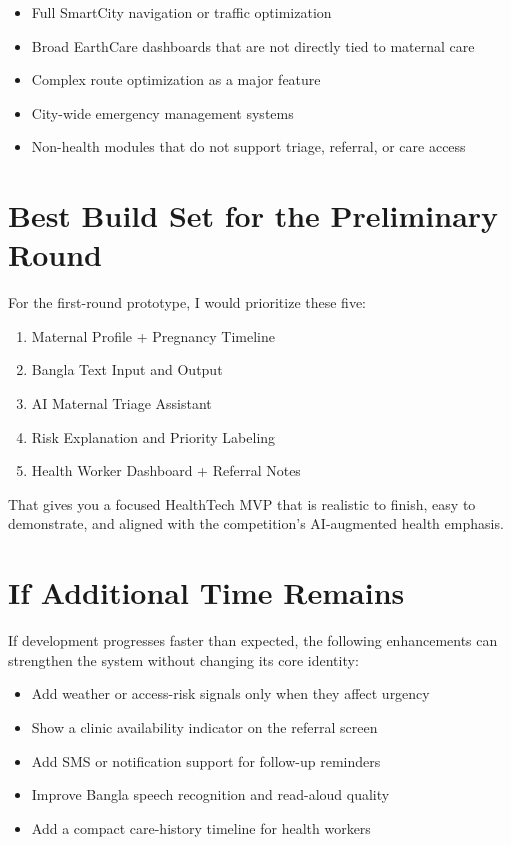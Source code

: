 \documentclass[11pt]{article}
\begin{document}
\begin{itemize}
    \item Full SmartCity navigation or traffic optimization
    \item Broad EarthCare dashboards that are not directly tied to maternal care
    \item Complex route optimization as a major feature
    \item City-wide emergency management systems
    \item Non-health modules that do not support triage, referral, or care access
\end{itemize}

\section{Best Build Set for the Preliminary Round}
For the first-round prototype, I would prioritize these five:

\begin{enumerate}
    \item Maternal Profile + Pregnancy Timeline
    \item Bangla Text Input and Output
    \item AI Maternal Triage Assistant
    \item Risk Explanation and Priority Labeling
    \item Health Worker Dashboard + Referral Notes
\end{enumerate}

That gives you a focused HealthTech MVP that is realistic to finish, easy to demonstrate, and aligned with the competition’s AI-augmented health emphasis.

\section{If Additional Time Remains}
If development progresses faster than expected, the following enhancements can strengthen the system without changing its core identity:

\begin{itemize}
    \item Add weather or access-risk signals only when they affect urgency
    \item Show a clinic availability indicator on the referral screen
    \item Add SMS or notification support for follow-up reminders
    \item Improve Bangla speech recognition and read-aloud quality
    \item Add a compact care-history timeline for health workers
\end{itemize}
\end{document}
